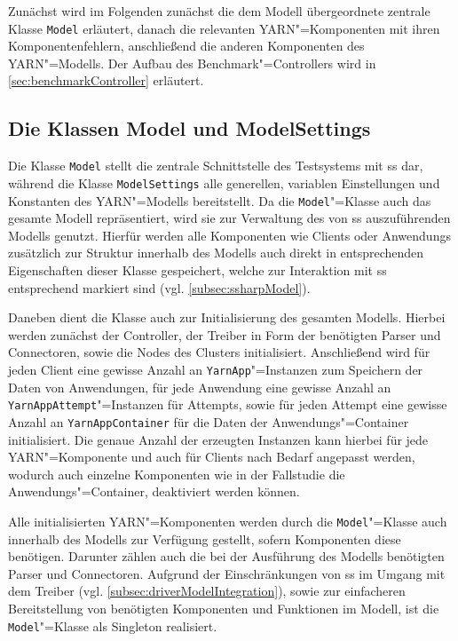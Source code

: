 Zunächst wird im Folgenden zunächst die dem Modell übergeordnete zentrale Klasse \texttt{Model} erläutert, danach die relevanten \gls{YARN}"=Komponenten mit ihren Komponentenfehlern, anschließend die anderen Komponenten des \gls{YARN}"=Modells.
Der Aufbau des Benchmark"=Controllers wird in \cref{sec:benchmarkController} erläutert.

\subsection{Die Klassen Model und ModelSettings}
\label{subsec:modelClass}

Die Klasse \texttt{Model} stellt die zentrale Schnittstelle des Testsystems mit \gls{ss} dar, während die Klasse \texttt{ModelSettings} alle generellen, variablen Einstellungen und Konstanten des \gls{YARN}"=Modells bereitstellt.
Da die \texttt{Model}"=Klasse auch das gesamte Modell repräsentiert, wird sie zur Verwaltung des von \gls{ss} auszuführenden Modells genutzt.
Hierfür werden alle Komponenten wie Clients oder \glspl{Anwendung} zusätzlich zur Struktur innerhalb des Modells auch direkt in entsprechenden Eigenschaften dieser Klasse gespeichert, welche zur Interaktion mit \gls{ss} entsprechend markiert sind (vgl. \cref{subsec:ssharpModel}).

Daneben dient die Klasse auch zur Initialisierung des gesamten Modells.
Hierbei werden zunächst der Controller, der Treiber in Form der benötigten Parser und Connectoren, sowie die Nodes des Clusters initialisiert.
Anschließend wird für jeden Client eine gewisse Anzahl an \texttt{YarnApp}"=Instanzen zum Speichern der Daten von Anwendungen, für jede \gls{Anwendung} eine gewisse Anzahl an \texttt{YarnAppAttempt}"=Instanzen für Attempts, sowie für jeden \gls{Attempt} eine gewisse Anzahl an \texttt{YarnAppContainer} für die Daten der Anwendungs"=Container initialisiert.
Die genaue Anzahl der erzeugten Instanzen kann hierbei für jede \gls{YARN}"=Komponente und auch für Clients nach Bedarf angepasst werden, wodurch auch einzelne Komponenten wie \zB in der Fallstudie die Anwendungs"=Container, deaktiviert werden können.

Alle initialisierten \gls{YARN}"=Komponenten werden durch die \texttt{Model}"=Klasse auch innerhalb des Modells zur Verfügung gestellt, sofern Komponenten diese benötigen.
Darunter zählen auch die bei der Ausführung des Modells benötigten Parser und Connectoren.
Aufgrund der Einschränkungen von \gls{ss} im Umgang mit dem Treiber (vgl. \cref{subsec:driverModelIntegration}), sowie zur einfacheren Bereitstellung von benötigten Komponenten und Funktionen im Modell, ist die \texttt{Model}"=Klasse als Singleton realisiert.

